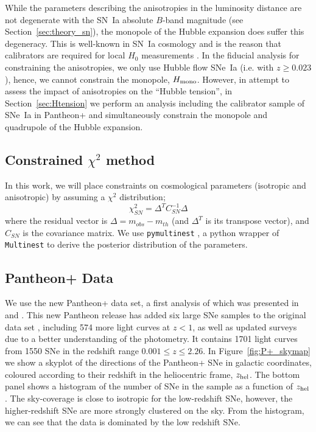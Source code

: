 \documentclass[fleqn,usenatbib]{mnras}
\begin{document}
{%
{While} the parameters describing the anisotropies {in the luminosity distance} %
are not degenerate with the SN~Ia absolute $B$-band magnitude {(see Section~\ref{sec:theory_sn}), the monopole of the Hubble expansion does suffer this degeneracy. This is well-known in SN~Ia cosmology and is the reason that calibrators are required for local $H_0$ measurements \citep[see, e.g.][]{Riess_2022,Freedman:2019}}. In the fiducial analysis for constraining the anisotropies, we only use Hubble flow SNe~Ia (i.e. with $z \geq 0.023$), hence, we cannot constrain the monopole, $H_{\rm mono}$. However, {in attempt to assess} %
the impact of anisotropies on the %
{``Hubble tension'', in Section~\ref{sec:Htension} we perform an analysis including the calibrator sample of SNe~Ia in Pantheon+ and simultaneously constrain the monopole and quadrupole of the Hubble expansion.}


\subsection{Constrained $\chi^2$ method}
\label{sec:chisq}
{In this work, we will place constraints on cosmological parameters (isotropic and anisotropic)}
{%
by assuming a $\chi ^2$ distribution; }
\begin{equation}
    \chi^2_{SN} = \Delta ^T C_{SN}^{-1} \Delta
\end{equation}
{where the residual vector is} $\Delta = m_{obs} - m_{th}$ {(and $\Delta^T$ is its transpose vector)}, %
and $C_{SN}$ is the covariance matrix. We use {\tt pymultinest} \citep{pymultinest}, a python wrapper of {\tt Multinest} \citep{Multinest_Feroz_Hobson_Bridges_2009} to derive the posterior {distribution} of the parameters.


\subsection{Pantheon+ Data}\label{sec:P+}



{We use the new} %
Pantheon+ \citep{scolnic2021pantheon+} data set, {a first analysis of which was presented}
in \citet{P+cosmology-2021} and \citet{Riess_2022}. 
This new Pantheon release has added {six} %
large {SNe} samples to the original data set \citep{pantheon_2018}, including 574 more light curves at $z<1$, as well as updated surveys due to a better understanding of the photometry. It contains 1701 light curves from 1550 {SNe} %
in the redshift range $0.001 \leq z \leq 2.26$. %
{In Figure~\ref{fig:P+_skymap} we show a skyplot of the directions of the Pantheon+ SNe in galactic coordinates, coloured according to their redshift in the heliocentric frame, $z_{\rm hel}$. The bottom panel shows a histogram of the number of SNe in the sample as a function of $z_{\rm hel}$. }
The sky-coverage is %
{close to} isotropic {for the low-redshift SNe, however, the higher-redshift SNe are more strongly clustered on the sky.} 
{From the histogram, we can} see that the data is dominated by the low redshift {SNe}. %

}
\end{document}
